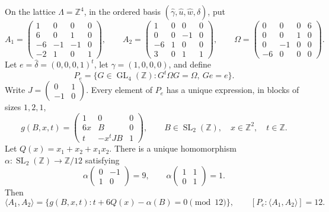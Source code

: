 \begin{proposition}\label{prop:cdp-index-twelve}
On the lattice $\Lambda=\mathbb Z^4$, in the ordered basis
$(\widehat\gamma,\widehat u,\widehat w,\widehat\delta)$, put
\[
 A_1=\begin{pmatrix}1&0&0&0\\6&0&1&0\\-6&-1&-1&0\\-2&1&0&1\end{pmatrix},
 \qquad
 A_2=\begin{pmatrix}1&0&0&0\\0&0&-1&0\\-6&1&0&0\\3&0&1&1\end{pmatrix},
 \qquad
 \Omega=\begin{pmatrix}0&0&0&6\\0&0&1&0\\0&-1&0&0\\-6&0&0&0\end{pmatrix}.
\]
Let $e=\widehat\delta=(0,0,0,1)^t$, let
$\gamma=(1,0,0,0)$, and define
\[
 P_e=\{G\in\operatorname{GL}_4(\mathbb Z):G^t\Omega G=\Omega,\ Ge=e\}.
\]
Write $J=\left(\begin{smallmatrix}0&1\\-1&0\end{smallmatrix}\right)$.
Every element of $P_e$ has a unique expression, in blocks of sizes $1,2,1$,
\[
 g(B,x,t)=
 \begin{pmatrix}1&0&0\\6x&B&0\\t&-x^tJB&1\end{pmatrix},
 \qquad B\in\operatorname{SL}_2(\mathbb Z),\quad x\in\mathbb Z^2,\quad t\in\mathbb Z.
\]
Let $Q(x)=x_1+x_2+x_1x_2$. There is a unique homomorphism
$\alpha:\operatorname{SL}_2(\mathbb Z)\to\mathbb Z/12$ satisfying
\[
 \alpha\!\begin{pmatrix}0&-1\\1&0\end{pmatrix}=9,
 \qquad
 \alpha\!\begin{pmatrix}1&1\\0&1\end{pmatrix}=1.
\]
Then
\[
 \langle A_1,A_2\rangle
 =\{g(B,x,t):t+6Q(x)-\alpha(B)=0\pmod {12}\},
 \qquad [P_e:\langle A_1,A_2\rangle]=12.
\]
\end{proposition}
